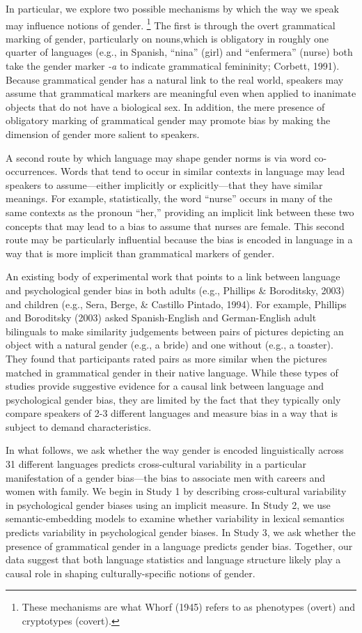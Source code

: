 \documentclass[10pt, letterpaper]{article}
\begin{document}
In particular, we explore two possible mechanisms by which the way we
speak may influence notions of gender.
\footnote{These mechanisms are what Whorf (1945) refers to as phenotypes (overt) and cryptotypes (covert).}
The first is through the overt grammatical marking of gender,
particularly on nouns,which is obligatory in roughly one quarter of
languages (e.g., in Spanish, ``nina'' (girl) and ``enfermera'' (nurse)
both take the gender marker \emph{-a} to indicate grammatical
femininity; Corbett, 1991). Because grammatical gender has a natural
link to the real world, speakers may assume that grammatical markers are
meaningful even when applied to inanimate objects that do not have a
biological sex. In addition, the mere presence of obligatory marking of
grammatical gender may promote bias by making the dimension of gender
more salient to speakers.

A second route by which language may shape gender norms is via word
co-occurrences. Words that tend to occur in similar contexts in language
may lead speakers to assume---either implicitly or explicitly---that
they have similar meanings. For example, statistically, the word
``nurse'' occurs in many of the same contexts as the pronoun ``her,''
providing an implicit link between these two concepts that may lead to a
bias to assume that nurses are female. This second route may be
particularly influential because the bias is encoded in language in a
way that is more implicit than grammatical markers of gender.

An existing body of experimental work that points to a link between
language and psychological gender bias in both adults (e.g., Phillips \&
Boroditsky, 2003) and children (e.g., Sera, Berge, \& Castillo Pintado,
1994). For example, Phillips and Boroditsky (2003) asked Spanish-English
and German-English adult bilinguals to make similarity judgements
between pairs of pictures depicting an object with a natural gender
(e.g., a bride) and one without (e.g., a toaster). They found that
participants rated pairs as more similar when the pictures matched in
grammatical gender in their native language. While these types of
studies provide suggestive evidence for a causal link between language
and psychological gender bias, they are limited by the fact that they
typically only compare speakers of 2-3 different languages and measure
bias in a way that is subject to demand characteristics.

In what follows, we ask whether the way gender is encoded linguistically
across 31 different languages predicts cross-cultural variability in a
particular manifestation of a gender bias---the bias to associate men
with careers and women with family. We begin in Study 1 by describing
cross-cultural variability in psychological gender biases using an
implicit measure. In Study 2, we use semantic-embedding models to
examine whether variability in lexical semantics predicts variability in
psychological gender biases. In Study 3, we ask whether the presence of
grammatical gender in a language predicts gender bias. Together, our
data suggest that both language statistics and language structure likely
play a causal role in shaping culturally-specific notions of gender.
\end{document}
